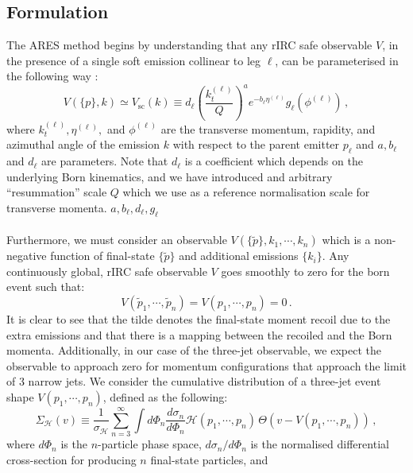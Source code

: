 \subsection{Formulation}
The ARES method begins by understanding that any rIRC safe observable $V$, in the presence of a single soft emission collinear to leg $\ell$, can be parameterised in the following way \cite{Arpino:2019ozn}:
\begin{equation}
	V(\{p\},k)\simeq V_{\text{sc}}(k)\equiv d_\ell\left(\frac{k_t^{(\ell)}}{Q}\right)^ae^{-b_\ell\eta^{(\ell)}}g_\ell(\phi^{(\ell)})\,,
	\label{eq:general-sc-V}
\end{equation}
where $k_t^{(\ell)},\eta^{(\ell)},$ and $\phi^{(\ell)}$ are the transverse momentum, rapidity, and azimuthal angle of the emission $k$ with respect to the parent emitter $p_\ell$ and $a, b_{\ell}$ and $d_\ell$ are parameters. Note that $d_\ell$ is a coefficient which depends on the underlying Born kinematics, and we have introduced and arbitrary \enquote{resummation} scale $Q$ which we use as a reference normalisation scale for transverse momenta. 
 $a, b_{\ell}, d_\ell, g_\ell$ 
\\ \\
Furthermore, we must consider an observable $V(\{\tilde{p}\},k_1,\cdots , k_n)$ which is a non-negative function of final-state $\{\tilde{p}\}$ and additional emissions $\{k_i\}$. Any continuously global, rIRC safe observable $V$ goes smoothly to zero for the born event such that:
\begin{equation}
V(\tilde{p}_1,\cdots , \tilde{p}_n)=V(p_1,\cdots ,p_n)=0\, .
	\label{eq:Born-observable}
\end{equation}
It is clear to see that the tilde denotes the final-state moment recoil due to the extra emissions and that there is a mapping between the recoiled and the Born momenta.
Additionally, in our case of the three-jet observable, we expect the observable to approach zero for momentum configurations that approach the limit of 3 narrow jets. 
We consider the cumulative distribution of a three-jet event shape $V(p_1,\cdots ,p_n)$, defined as the following:
\begin{equation}
	\Sigma_{\mathcal{H}}(v)\equiv\frac{1}{\sigma_{\mathcal{H}}}\sum_{n=3}^{\infty}\int d\Phi_n\frac{d\sigma_n}{d\Phi_n}\mathcal{H}(p_1,\cdots ,p_n)\,\Theta(v-V(p_1,\cdots ,p_n))\,,
	\label{eq:hard-cumulant}
\end{equation}
where $d\Phi_n$ is the $n$-particle phase space, $d\sigma_n/d\Phi_n$ is the normalised differential cross-section for producing $n$ final-state particles, and 
